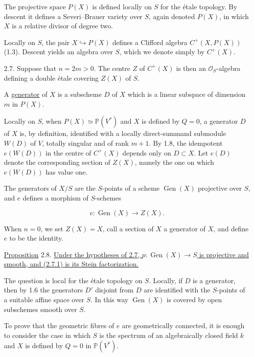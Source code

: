 The projective space $P(X)$ is defined locally on $S$ for the \'{e}tale
topology.  By descent it defines a Severi--Brauer variety over $S$,
again denoted $P(X)$, in which $X$ is a relative divisor of degree two.

Locally on $S$, the pair $X\hookrightarrow P(X)$ defines a Clifford
algebra $C^+(X,P(X))$ (1.3).  Descent yields an algebra over $S$, which
we denote simply by $C^+(X)$.

2.7. Suppose that $n=2m>0$.  The centre $Z$ of $C^+(X)$ is then an
$\mathcal O_S$-algebra defining a double \'{e}tale covering $Z(X)$ of
$S$.

A \underline{generator} of $X$ is a subscheme $D$ of $X$ which is a
linear subspace of dimension $m$ in $P(X)$.

Locally on $S$, when $P(X)\simeq\mathbb P(V^*)$ and $X$ is defined by
$Q=0$, a generator $D$ of $X$ is, by definition, identified with a
locally direct-summand submodule $W(D)$ of $V$, totally singular and of
rank $m+1$.  By 1.8, the idempotent $e(W(D))$ in the centre of $C^+(X)$
depends only on $D\subset X$.  Let $e(D)$ denote the corresponding
section of $Z(X)$, namely the one on which $e(W(D))$ has value one.

The generators of $X/S$ are the $S$-points of a scheme
$\operatorname{Gen}(X)$ projective over $S$, and $e$ defines a morphism
of $S$-schemes

\begin{equation}\tag{2.7.1}
e:\operatorname{Gen}(X)\longrightarrow Z(X).
\end{equation}

When $n=0$, we set $Z(X)=X$, call a section of $X$ a generator of $X$,
and define $e$ to be the identity.


\underline{Proposition} 2.8. \underline{Under the hypotheses of 2.7,
$p:\operatorname{Gen}(X)\longrightarrow S$ is projective and smooth,
and (2.7.1) is its Stein factorization.}

The question is local for the \'{e}tale topology on $S$.  Locally, if
$D$ is a generator, then by 1.6 the generators $D'$ disjoint from $D$
are identified with the $S$-points of a suitable affine space over $S$.
In this way $\operatorname{Gen}(X)$ is covered by open subschemes smooth
over $S$.

To prove that the geometric fibres of $e$ are geometrically connected,
it is enough to consider the case in which $S$ is the spectrum of an
algebraically closed field $k$ and $X$ is defined by $Q=0$ in
$\mathbb P(V^*)$.

